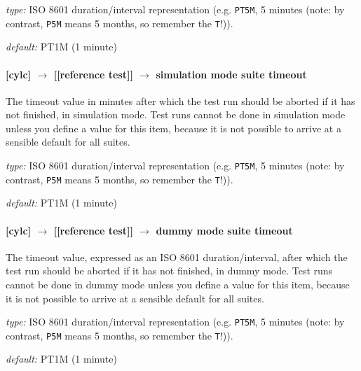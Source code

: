 \begin{myitemize}
    \item {\em type:} ISO 8601 duration/interval representation (e.g.
 \lstinline=PT5M=, 5 minutes (note: by contrast, \lstinline=P5M= means 5
 months, so remember the \lstinline=T=!)).
    \item {\em default:} PT1M (1 minute)
\end{myitemize}

\paragraph[simulation mode suite timeout]{[cylc] $\rightarrow$ [[reference test]] $\rightarrow$ simulation mode suite timeout}

The timeout value in minutes after which the test run should be aborted
if it has not finished, in simulation mode. Test runs cannot be done in
simulation mode unless you define a value for this item, because it is
not possible to arrive at a sensible default for all suites.

\begin{myitemize}
    \item {\em type:} ISO 8601 duration/interval representation (e.g.
 \lstinline=PT5M=, 5 minutes (note: by contrast, \lstinline=P5M= means 5
 months, so remember the \lstinline=T=!)).
    \item {\em default:} PT1M (1 minute)
\end{myitemize}

\paragraph[dummy mode suite timeout]{[cylc] $\rightarrow$ [[reference test]] $\rightarrow$ dummy mode suite timeout}

The timeout value, expressed as an ISO 8601 duration/interval, after which the
test run should be aborted if it has not finished, in dummy mode.  Test runs
cannot be done in dummy mode unless you define a value for this item, because
it is not possible to arrive at a sensible default for all suites.

\begin{myitemize}
    \item {\em type:} ISO 8601 duration/interval representation (e.g.
 \lstinline=PT5M=, 5 minutes (note: by contrast, \lstinline=P5M= means 5
 months, so remember the \lstinline=T=!)).
    \item {\em default:} PT1M (1 minute)
\end{myitemize}

